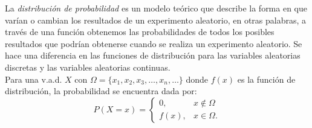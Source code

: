 \noindent La \emph{distribución de probabilidad} es un modelo teórico que describe la forma en que varían o cambian los resultados de un experimento aleatorio, en otras palabras, a través de una función obtenemos las probabilidades de todos los posibles resultados que podrían obtenerse cuando se realiza un experimento aleatorio. Se hace una diferencia en las funciones de distribución para las variables aleatorias discretas y las variables aleatorias continuas.\\

\noindent Para  una v.a.d. $X$ con $\Omega=\{x_1,x_2, x_3,\ldots,x_n,\ldots\}$ donde $f(x)$ es la función de distribución, la probabilidad se encuentra dada por:
\begin{equation}
P(X=x)=\begin{cases}
0, & x\notin\Omega\\
f(x), & x\in\Omega.
\end{cases}
\label{eq:FP}
\end{equation}

